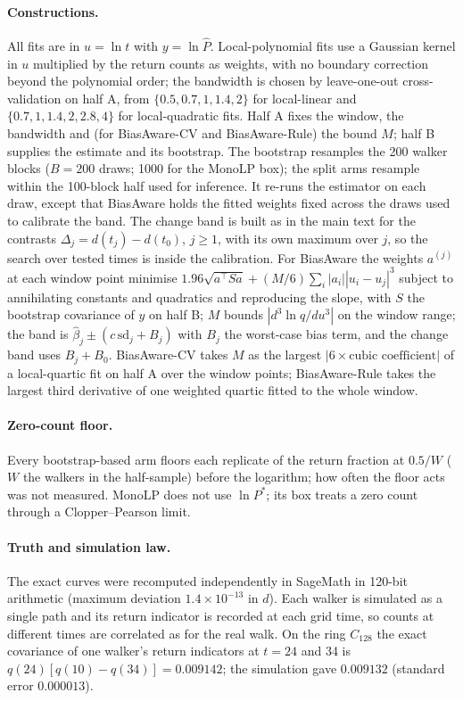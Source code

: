 \documentclass[aps,pre,twocolumn,superscriptaddress,nofootinbib,10pt]{revtex4-2}
\begin{document}
\paragraph*{Constructions.}
All fits are in $u=\ln t$ with $y=\ln\hat P$. Local-polynomial fits use a Gaussian kernel in $u$ multiplied by the return counts as weights, with no boundary correction beyond the polynomial order; the bandwidth is chosen by leave-one-out cross-validation on half A, from $\{0.5,0.7,1,1.4,2\}$ for local-linear and $\{0.7,1,1.4,2,2.8,4\}$ for local-quadratic fits. Half A fixes the window, the bandwidth and (for \textsf{BiasAware-CV} and \textsf{BiasAware-Rule}) the bound $M$; half B supplies the estimate and its bootstrap. The bootstrap resamples the 200 walker blocks ($B=200$ draws; 1000 for the \textsf{MonoLP} box); the split arms resample within the 100-block half used for inference. It re-runs the estimator on each draw, except that \textsf{BiasAware} holds the fitted weights fixed across the draws used to calibrate the band. The change band is built as in the main text for the contrasts $\Delta_j=d(t_j)-d(t_0)$, $j\ge1$, with its own maximum over $j$, so the search over tested times is inside the calibration. For \textsf{BiasAware} the weights $a^{(j)}$ at each window point minimise $1.96\sqrt{a^{\top}Sa}+(M/6)\sum_i|a_i||u_i-u_j|^3$ subject to annihilating constants and quadratics and reproducing the slope, with $S$ the bootstrap covariance of $y$ on half B; $M$ bounds $|d^3\ln q/du^3|$ on the window range; the band is $\hat\beta_j\pm(c\,\mathrm{sd}_j+B_j)$ with $B_j$ the worst-case bias term, and the change band uses $B_j+B_0$. \textsf{BiasAware-CV} takes $M$ as the largest $|6\times\text{cubic coefficient}|$ of a local-quartic fit on half A over the window points; \textsf{BiasAware-Rule} takes the largest third derivative of one weighted quartic fitted to the whole window.

\paragraph*{Zero-count floor.}
Every bootstrap-based arm floors each replicate of the return fraction at $0.5/W$ ($W$ the walkers in the half-sample) before the logarithm; how often the floor acts was not measured. \textsf{MonoLP} does not use $\ln P^*$; its box treats a zero count through a Clopper--Pearson limit.

\paragraph*{Truth and simulation law.}
The exact curves were recomputed independently in SageMath in 120-bit arithmetic (maximum deviation $1.4\times10^{-13}$ in $d$). Each walker is simulated as a single path and its return indicator is recorded at each grid time, so counts at different times are correlated as for the real walk. On the ring $C_{128}$ the exact covariance of one walker's return indicators at $t=24$ and 34 is $q(24)[q(10)-q(34)]=0.009142$; the simulation gave $0.009132$ (standard error $0.000013$).
\end{document}
